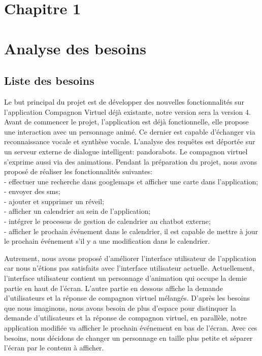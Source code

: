 \section*{Chapitre 1}
\section{Analyse des besoins}
\subsection{Liste des besoins}
Le but principal du projet est de développer des nouvelles fonctionnalités sur l'application Compagnon Virtuel déjà existante, notre version sera la version 4.
Avant de commencer le projet, l'application est déjà fonctionnelle, elle propose une interaction avec un personnage animé. Ce dernier est capable d'échanger via reconnaissance vocale et synthèse vocale. L'analyse des requêtes est déportée sur un serveur externe de dialogue intelligent: pandorabots. Le compagnon virtuel s'exprime aussi via des animations. Pendant la préparation du projet, nous avons proposé de réaliser les fonctionnalités suivantes:\\
	\indent- effectuer une recherche dans googlemaps et afficher une carte dans l'application;\\
	\indent- envoyer des sms;\\
	\indent- ajouter et supprimer un réveil;\\
	\indent- afficher un calendrier au sein de l'application;\\
	\indent- intégrer le processus de gestion de calendrier au chatbot externe;\\
	\indent- afficher le prochain événement dans le calendrier, il est capable de mettre à jour le prochain événement s'il y a une modification dans le calendrier.
	
Autrement, nous avons proposé d'améliorer l'interface utilisateur de l'application car nous n'étions pas satisfaits avec l'interface utilisateur actuelle. Actuellement, l'interface utilisateur contient un personnage d'animation qui occupe la demie partie en haut de l'écran. L'autre partie en dessous affiche la demande d'utilisateurs et la réponse de compagnon virtuel mélangés. D'après les besoins  que nous imaginons, nous avons besoin de plus d'espace pour distinquer la demande d'utilisateurs et la réponse de compagnon virtuel, en parallèle, notre application modifiée va afficher le prochain événement en bas de l'écran. Avec ces besoins, nous décidons de changer un personnage en taille plus petite et séparer l'écran par le contenu à afficher. 

